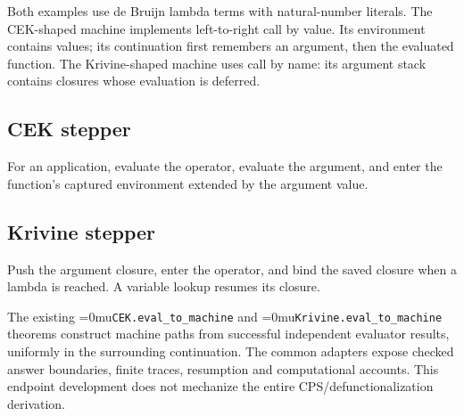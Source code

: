\documentclass[11pt,a4paper]{article}
\newcommand{\name}[1]{\textup{\Urlmuskip=0mu\relax\nolinkurl{#1}}}
\begin{document}
Both examples use de Bruijn lambda terms with natural-number literals.
The CEK-shaped machine implements left-to-right call by value. Its environment
contains values; its continuation first remembers an argument, then the
evaluated function. The Krivine-shaped machine uses call by name: its argument
stack contains closures whose evaluation is deferred.

\subsection*{CEK stepper}
For an application, evaluate the operator, evaluate the argument, and enter the
function's captured environment extended by the argument value.
\begin{center}
\end{center}
\subsection*{Krivine stepper}
Push the argument closure, enter the operator, and bind the saved closure when
a lambda is reached. A variable lookup resumes its closure.
\begin{center}
\end{center}

The existing \name{CEK.eval_to_machine} and
\name{Krivine.eval_to_machine} theorems construct machine paths from successful
independent evaluator results, uniformly in the surrounding continuation.
The common adapters expose checked answer boundaries, finite traces, resumption
and computational accounts. This endpoint development does not mechanize the
entire CPS/defunctionalization derivation.
\end{document}
